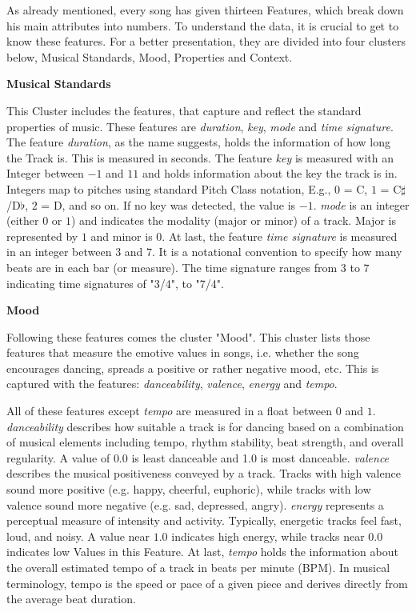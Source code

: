 As already mentioned, every song has given thirteen Features, which break down his main attributes into numbers.
To understand the data, it is crucial to get to know these features.
For a better presentation, they are divided into four clusters below, 
Musical Standards, Mood, Properties and Context.

\textbf{Musical Standards}

This Cluster includes the features, that capture and reflect the standard properties of music. 
These features are \emph{duration}, \emph{key}, \emph{mode} and \emph{time signature}. 
The feature \emph{duration}, as the name suggests, holds the information of how long the Track is.
This is measured in seconds. The feature \emph{key} is measured with an Integer between \(-1\) and \(11\) and 
holds information about the key the track is in. Integers map to pitches using standard Pitch Class notation, E.g., \(0\) = C, \(1\) = C\(\sharp\) /D\(\flat\), \(2\) = D, and so on. 
If no key was detected, the value is \(-1\).
\emph{mode} is an integer (either \(0\) or \(1\)) and indicates the modality (major or minor) of a track. Major is represented by \(1\) and minor is \(0\). 
At last, the feature \emph{time signature} is measured in an integer between \(3\) and \(7\).
It is a notational convention to specify how many beats are in each bar (or measure). 
The time signature ranges from \(3\) to \(7\) indicating time signatures of "3/4", to "7/4". \cite[]{Features}

\textbf{Mood}

Following these features comes the cluster "Mood".
This cluster lists those features that measure the emotive values in songs, 
i.e. whether the song encourages dancing, spreads a positive or rather negative mood,
etc. This is captured with the features: \emph{danceability}, \emph{valence}, \emph{energy} and \emph{tempo}.

All of these features except \emph{tempo} are measured in a float between \(0\) and \(1\). 
\emph{danceability} describes how suitable a track is for dancing based on a combination of musical elements
including tempo, rhythm stability, beat strength, and overall regularity. A value of \(0.0\) is least danceable and 1.0 is most danceable.
\emph{valence} describes the musical positiveness conveyed by a track. 
Tracks with high valence sound more positive (e.g. happy, cheerful, euphoric),
while tracks with low valence sound more negative (e.g. sad, depressed, angry).  
\emph{energy} represents a perceptual measure of intensity and activity. Typically, energetic tracks feel fast, loud, and noisy. 
A value near \(1.0\) indicates high energy, while tracks near \(0.0\) indicates low Values in this Feature. 
At last, \emph{tempo} holds the information about the overall estimated tempo of a track in beats per
minute (BPM). In musical terminology, tempo is the speed or pace of a given piece and derives directly from the
average beat duration. \cite[]{Features}

